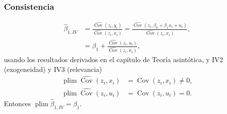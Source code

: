 \documentclass[t, compress, spanish, aspectratio=169]{beamer}
\DeclareMathOperator{\plim}{plim}
\DeclareMathOperator{\Cov}{Cov}
\begin{document}

\begin{frame}
    \frametitle{Consistencia}
        \begin{align*}
            \hat \beta_{1,IV} &=\frac{\widehat{\Cov}(z_i,y_i)}{\widehat{\Cov}(z_i,x_i)}= \frac{\widehat{\Cov}(z_i,\beta_0+\beta_1 x_i+u_i)}{\widehat{\Cov}(z_i,x_i)},\\
            & = \beta_1+\frac{\widehat{\Cov}(z_i,u_i)}{\widehat{\Cov}(z_i,x_i)},
        \end{align*}
        usando los resultados derivados en el cap\'itulo de Teor\'ia asint\'otica, y IV2 (exogeneidad) y IV3 (relevancia)
        \begin{align*}
            \plim \widehat{\Cov}(z_i,x_i) & = {\Cov}(z_i,x_i) \neq 0, \\
            \plim \widehat{\Cov}(z_i,u_i) & = {\Cov}(z_i,u_i) = 0.
        \end{align*}
        Entonces    $\plim \hat \beta_{1,IV}=\beta_{1}$.
\end{frame}

%
%
%
%
\end{document}
